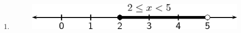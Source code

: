 {\begin{mdframed}[linewidth=4, leftmargin=40, rightmargin=40]
\begin{exercise}
\begin{enumerate}[noitemsep, label=\textbf{Step} \textbf{\arabic*}. ]
{\begin{minipage}{\columnwidth}
    \parbox[t]{\mymathboxwidth}{\large$
    5-3\^{a}‰¤x+3-3\lessthan{}8-32\^{a}‰¤x\lessthan{}5$}\hfill
    \parbox[t]{48pt}{\raggedleft 
    (9.63)}
    \end{minipage}\vspace{12pt}\par
    }%
      \item  
      \label{m39254*id158456}
    \setcounter{subfigure}{0}
	\begin{figure}[H] %
    \begin{center}
    \label{m39254*id158459!!!underscore!!!media}\label{m39254*id158459!!!underscore!!!printimage}\includegraphics{col11306.imgs/m39254_MG10C10_005.png} %
      \vspace{2pt}
    \vspace{.1in}
    \end{center}
 \end{figure}       
      \par 
      \end{enumerate}
    \end{exercise}
    \end{mdframed}
    }
    \noindent
